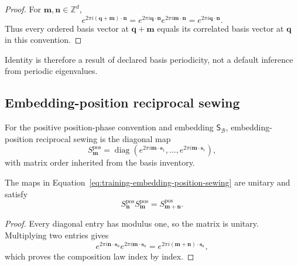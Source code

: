 \begin{proof}
For \(\mathbf m,\mathbf n\in\mathbb Z^d\),
\begin{equation}
  e^{2\pi i(\mathbf q+\mathbf m)\cdot\mathbf n}
  =e^{2\pi i\mathbf q\cdot\mathbf n}
   e^{2\pi i\mathbf m\cdot\mathbf n}
  =e^{2\pi i\mathbf q\cdot\mathbf n}.
\end{equation}
Thus every ordered basis vector at \(\mathbf q+\mathbf m\) equals its correlated
basis vector at \(\mathbf q\) in this convention.
\end{proof}

Identity is therefore a result of declared basis periodicity, not a default
inference from periodic eigenvalues.

\subsection{Embedding-position reciprocal sewing}

\begin{definition}
\label{def:training-embedding-position-sewing}
For the positive position-phase convention and embedding
\(\mathsf S_{\mathcal B}\), embedding-position reciprocal sewing is the
diagonal map
\begin{equation}
  S_{\mathbf m}^{\mathrm{pos}}
  =\operatorname{diag}\left(
    e^{2\pi i\mathbf m\cdot\mathbf s_1},\ldots,
    e^{2\pi i\mathbf m\cdot\mathbf s_r}
  \right),
  \label{eq:training-embedding-position-sewing}
\end{equation}
with matrix order inherited from the basis inventory.
\end{definition}

\begin{proposition}
\label{prop:training-embedding-sewing-unitary}
The maps in Equation~\eqref{eq:training-embedding-position-sewing} are unitary
and satisfy
\begin{equation}
  S_{\mathbf n}^{\mathrm{pos}}
  S_{\mathbf m}^{\mathrm{pos}}
  =S_{\mathbf m+\mathbf n}^{\mathrm{pos}}.
\end{equation}
\end{proposition}

\begin{proof}
Every diagonal entry has modulus one, so the matrix is unitary. Multiplying two
entries gives
\begin{equation}
  e^{2\pi i\mathbf n\cdot\mathbf s_a}
  e^{2\pi i\mathbf m\cdot\mathbf s_a}
  =e^{2\pi i(\mathbf m+\mathbf n)\cdot\mathbf s_a},
\end{equation}
which proves the composition law index by index.
\end{proof}

